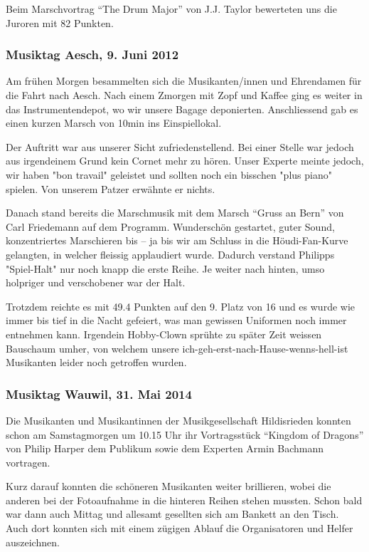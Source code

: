 \begin{history}
    Beim Marschvortrag \enquote{The Drum Major} von J.J. Taylor bewerteten uns
    die Juroren mit 82 Punkten.


    \subsubsection*{Musiktag Aesch, 9. Juni 2012}

    Am frühen Morgen besammelten sich die Musikanten/innen und Ehrendamen für
    die Fahrt nach Aesch. Nach einem Zmorgen mit Zopf und Kaffee ging es weiter
    in das Instrumentendepot, wo wir unsere Bagage deponierten. Anschliessend
    gab es einen kurzen Marsch von 10min ins Einspiellokal.

    Der Auftritt war aus unserer Sicht zufriedenstellend. Bei einer Stelle war
    jedoch aus irgendeinem Grund kein Cornet mehr zu hören. Unser Experte meinte
    jedoch, wir haben "bon travail" geleistet und sollten noch ein bisschen
    "plus piano" spielen. Von unserem Patzer erwähnte er nichts.

    Danach stand bereits die Marschmusik mit dem Marsch \enquote{Gruss an Bern}
    von Carl Friedemann auf dem Programm. Wunderschön gestartet, guter Sound,
    konzentriertes Marschieren bis -- ja bis wir am Schluss in die
    Höudi-Fan-Kurve gelangten, in welcher fleissig applaudiert wurde. Dadurch
    verstand Philipps "Spiel-Halt" nur noch knapp die erste Reihe. Je weiter
    nach hinten, umso holpriger und verschobener war der Halt.

    Trotzdem reichte es mit 49.4 Punkten auf den 9. Platz von 16 und es wurde
    wie immer bis tief in die Nacht gefeiert, was man gewissen Uniformen noch
    immer entnehmen kann. Irgendein Hobby-Clown sprühte zu später Zeit weissen
    Bauschaum umher, von welchem unsere ich-geh-erst-nach-Hause-wenns-hell-ist
    Musikanten leider noch getroffen wurden.


    \subsubsection*{Musiktag Wauwil, 31. Mai 2014}

    Die Musikanten und Musikantinnen der Musikgesellschaft Hildisrieden konnten
    schon am Samstagmorgen um 10.15 Uhr ihr Vortragsstück  \enquote{Kingdom of
        Dragons} von Philip Harper dem Publikum sowie dem Experten Armin Bachmann
    vortragen.

    Kurz darauf konnten die schöneren Musikanten weiter brillieren, wobei die
    anderen bei der Fotoaufnahme in die hinteren Reihen stehen mussten. Schon
    bald war dann auch Mittag und allesamt gesellten sich am Bankett an den
    Tisch. Auch dort konnten sich mit einem zügigen Ablauf die Organisatoren und
    Helfer auszeichnen.


\end{history}
